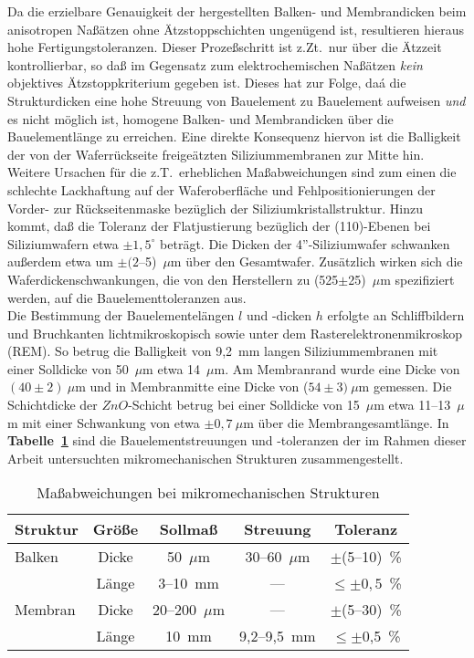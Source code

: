 Da die erzielbare Genauigkeit der hergestellten Balken- und Membrandicken
beim anisotropen Naßätzen ohne Ätzstoppschichten ungenügend ist,
resultieren hieraus hohe Fertigungstoleranzen. Dieser Prozeßschritt ist
z.Zt.\ nur über die Ätzzeit kontrollierbar, so daß im Gegensatz zum
elektrochemischen
Naßätzen {\em kein} objektives Ätzstoppkriterium gegeben ist. Dieses
hat zur Folge, daá die Strukturdicken eine hohe Streuung von Bauelement
zu Bauelement aufweisen {\em und} es nicht möglich ist, homogene Balken- und
Membrandicken über die Bauelementlänge zu erreichen.
Eine direkte Konsequenz hiervon ist die Balligkeit der von der
Waferrückseite freigeätzten Siliziummembranen
zur Mitte hin. Weitere Ursachen für die z.T.\ erheblichen Maßabweichungen
sind zum einen die schlechte Lackhaftung auf der Waferoberfläche und
Fehlpositionierungen der Vorder- zur Rückseitenmaske bezüglich der
Siliziumkristallstruktur. Hinzu kommt, daß die Toleranz der Flatjustierung
bezüglich der (110)-Ebenen bei Siliziumwafern etwa $\pm1,5^{\circ}$ beträgt.
Die Dicken der 4''-Siliziumwafer schwanken außerdem etwa um
$\pm(2$--5)~$\mu$m über den Gesamtwafer. Zusätzlich wirken sich die
Waferdickenschwankungen, die von den Herstellern zu (525$\pm$25)~$\mu$m
spezifiziert werden, auf die Bauelementtoleranzen aus. \\
%
Die Bestimmung der Bauelementelängen $l$ und -dicken $h$ erfolgte
an Schliffbildern und Bruchkanten lichtmikroskopisch sowie unter
dem Rasterelektronenmikroskop (REM).
So betrug die Balligkeit von 9,2~mm langen Siliziummembranen mit einer
Solldicke von 50~$\mu$m etwa 14~$\mu$m. Am Membranrand wurde eine
Dicke von $(40\pm2)~\mu$m und in Membranmitte eine Dicke von
($54\pm3)~\mu$m gemessen. Die Schichtdicke der $ZnO$-Schicht betrug
bei einer Solldicke von 15~$\mu$m etwa 11--13~$\mu$m mit einer Schwankung
von etwa $\pm0,7~\mu$m über die Membrangesamtlänge.
In {\bf Tabelle~\ref{tabgeomfehler}} sind die Bauelementstreuungen und
-toleranzen der im Rahmen dieser Arbeit untersuchten mikromechanischen
Strukturen zusammengestellt.
\begin{table}[htb]
\caption{\label{tabgeomfehler}
 Maßabweichungen bei mikromechanischen Strukturen}
\begin{center}
\begin{tabular}{|l||c|c|c|c|}
\hline
 {\bf Struktur} &  Größe   &  Sollmaß  & Streuung  & Toleranz \\
\hline \hline
 Balken   &  Dicke   &  50~$\mu$m  & 30--60~$\mu$m  &  $\pm$(5--10)~\%   \\
          &  Länge   &  3--10~mm   & ---            &  $\leq \pm0,5$~\%  \\
\hline
 Membran  &  Dicke   &  20--200~$\mu$m   & ---  &  $\pm$(5--30)~\%    \\
          &  Länge   &  10~mm   &  9,2--9,5~mm  &  $\leq \pm$0,5~\%   \\
\hline
\end{tabular}
\end{center}
\end{table}
